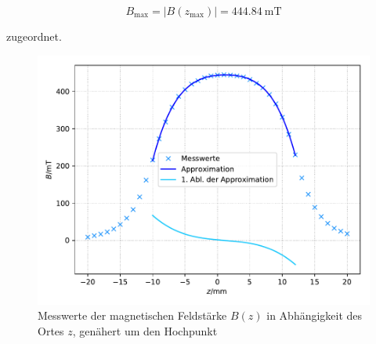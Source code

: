 \begin{equation*}
    B_\text{max} = |B(z_\text{max})| = \SI{444.84}{\milli\tesla}
\end{equation*}

zugeordnet.

\begin{figure}[H]
    \centering
    \includegraphics[scale=0.8]{content/plot1.pdf}
    \caption{Messwerte der magnetischen Feldstärke $B(z)$ in Abhängigkeit des Ortes $z$, genähert um den Hochpunkt}
    \label{fig:plot1}
\end{figure}

